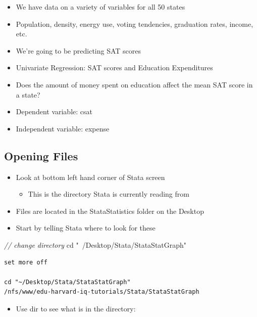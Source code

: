 \documentclass[
]{book}
\newenvironment{Shaded}{\begin{snugshade}}{\end{snugshade}}
\newcommand{\CommentTok}[1]{\textcolor[rgb]{0.56,0.35,0.01}{\textit{#1}}}
\newcommand{\NormalTok}[1]{#1}
\newcommand{\StringTok}[1]{\textcolor[rgb]{0.31,0.60,0.02}{#1}}
\providecommand{\tightlist}{%
  \setlength{\itemsep}{0pt}\setlength{\parskip}{0pt}}
\begin{document}
\begin{itemize}
\tightlist
\item
  We have data on a variety of variables for all 50 states
\item
  Population, density, energy use, voting tendencies, graduation rates, income, etc.
\item
  We're going to be predicting SAT scores
\item
  Univariate Regression: SAT scores and Education Expenditures
\item
  Does the amount of money spent on education affect the mean SAT score in a state?
\item
  Dependent variable: csat
\item
  Independent variable: expense
\end{itemize}

\hypertarget{opening-files-1}{%
\subsection{Opening Files}\label{opening-files-1}}

\begin{itemize}
\tightlist
\item
  Look at bottom left hand corner of Stata screen

  \begin{itemize}
  \tightlist
  \item
    This is the directory Stata is currently reading from
  \end{itemize}
\item
  Files are located in the StataStatistics folder on the Desktop
\item
  Start by telling Stata where to look for these
\end{itemize}

\begin{Shaded}
\begin{Highlighting}[]
  \CommentTok{// change directory}
\NormalTok{  cd }\StringTok{"~/Desktop/Stata/StataStatGraph"}
\end{Highlighting}
\end{Shaded}

\begin{verbatim}
set more off

cd "~/Desktop/Stata/StataStatGraph"
/nfs/www/edu-harvard-iq-tutorials/Stata/StataStatGraph
\end{verbatim}

\begin{itemize}
\tightlist
\item
  Use dir to see what is in the directory:
\end{itemize}
\end{document}

